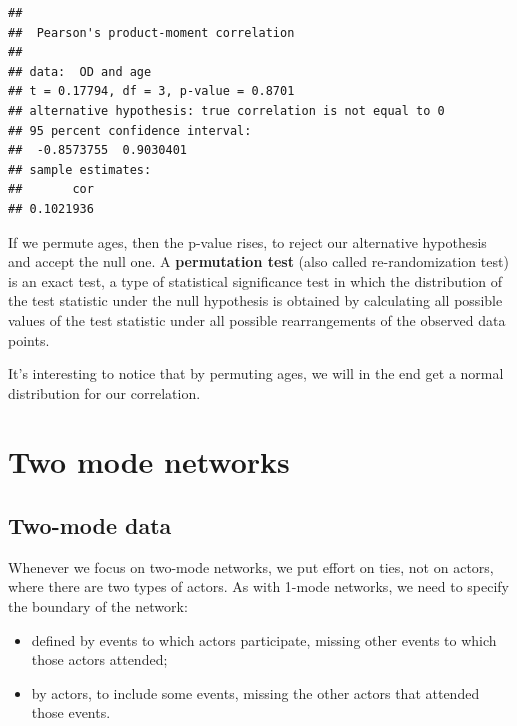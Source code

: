 \documentclass[
  notitlepage,
  onecolumn,
  openany]{book}
\providecommand{\tightlist}{%
  \setlength{\itemsep}{0pt}\setlength{\parskip}{0pt}}
\begin{document}
\begin{verbatim}
## 
##  Pearson's product-moment correlation
## 
## data:  OD and age
## t = 0.17794, df = 3, p-value = 0.8701
## alternative hypothesis: true correlation is not equal to 0
## 95 percent confidence interval:
##  -0.8573755  0.9030401
## sample estimates:
##       cor 
## 0.1021936
\end{verbatim}

If we permute ages, then the p-value rises, to reject our alternative hypothesis and accept the null one. A \textbf{permutation test} (also called re-randomization test) is an exact test, a type of statistical significance test in which the distribution of the test statistic under the null hypothesis is obtained by calculating all possible values of the test statistic under all possible rearrangements of the observed data points.

It's interesting to notice that by permuting ages, we will in the end get a normal distribution for our correlation.

\hypertarget{two-mode-networks}{%
\chapter{Two mode networks}\label{two-mode-networks}}

\hypertarget{two-mode-data}{%
\section{Two-mode data}\label{two-mode-data}}

Whenever we focus on two-mode networks, we put effort on ties, not on actors, where there are two types of actors. As with 1-mode networks, we need to specify the boundary of the network:

\begin{itemize}
\tightlist
\item
  defined by events to which actors participate, missing other events to which those actors attended;
\item
  by actors, to include some events, missing the other actors that attended those events.
\end{itemize}
\end{document}
